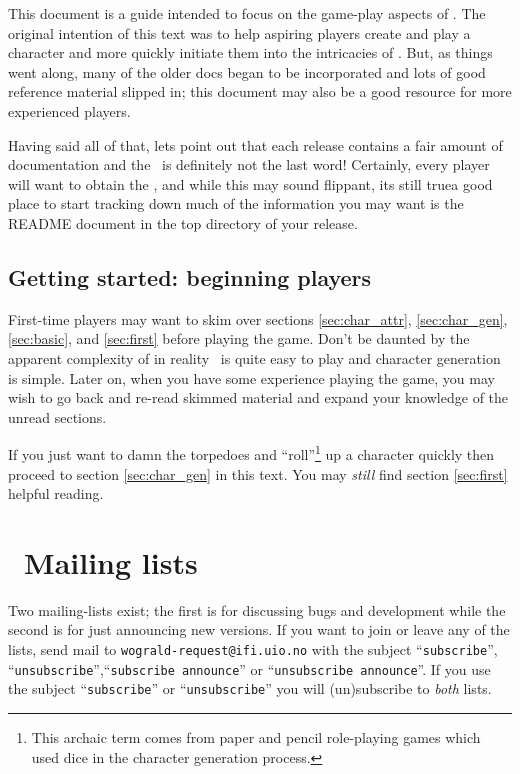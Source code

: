 This document is a guide intended to focus on the game-play aspects of \cf . 
The original intention of this text was to 
help aspiring players create and play a character and more quickly initiate
them into the intricacies of \cf . But, as things went along, many of the 
older docs began to be incorporated and lots of good reference material 
slipped in; this document may also be a good resource for more experienced 
players.

Having said all of that, lets point out that each release contains
a fair amount of documentation and the \playbook\ is definitely not the 
last word! Certainly, every player will want to obtain the \spoiler , 
and while this may sound flippant, its still true\emdash a good place to 
start tracking down much of the information you may want is the 
README document in the top directory of your release.


\subsection{Getting started: beginning players} 

First-time players may want to skim over sections 
\ref{sec:char_attr}, \ref{sec:char_gen}, \ref{sec:basic},
and \ref{sec:first} before playing the game. Don't be daunted by 
the apparent complexity of \cf \emdash in reality \cf\ is quite easy 
to play and character generation
is simple. Later on, when you have some experience
playing the game, you may wish to go back and re-read skimmed material
and expand your knowledge of the unread sections. 

If you just want to damn the torpedoes and ``roll''\footnote{This archaic 
term comes from paper and pencil role-playing games which used dice in 
the character generation process.} up a character quickly then proceed 
to section \ref{sec:char_gen} in this text. You may {\em still} 
find section \ref{sec:first} helpful reading. 


\section{\cf\ Mailing lists}\label{sec:mlist} 

Two mailing-lists exist; the first is for discussing bugs and
development while the second is for just announcing new versions.
If you want to join or leave any of the lists, send mail to
{\tt wograld-}{\tt request@}{\tt ifi.uio.no} with the subject ``{\tt subscribe}'',
``{\tt unsubscribe}'',``{\tt subscribe announce}'' or ``{\tt unsubscribe 
announce}''.  If you use the subject ``{\tt subscribe}'' or 
``{\tt unsubscribe}'' you will (un)subscribe to {\em both} lists.

